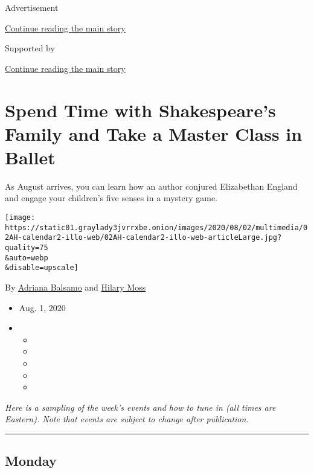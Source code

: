 Advertisement

\protect\hyperlink{after-top}{Continue reading the main story}

Supported by

\protect\hyperlink{after-sponsor}{Continue reading the main story}

\hypertarget{spend-time-with-shakespeares-family-and-take-a-master-class-in-ballet}{%
\section{Spend Time with Shakespeare's Family and Take a Master Class in
Ballet}\label{spend-time-with-shakespeares-family-and-take-a-master-class-in-ballet}}

As August arrives, you can learn how an author conjured Elizabethan
England and engage your children's five senses in a mystery game.

\texttt{[image: https://static01.graylady3jvrrxbe.onion/images/2020/08/02/multimedia/02AH-calendar2-illo-web/02AH-calendar2-illo-web-articleLarge.jpg?quality=75\\\&auto=webp\\\&disable=upscale]}

By \href{https://www.nytimes3xbfgragh.onion/by/adriana-balsamo}{Adriana
Balsamo} and
\href{https://www.nytimes3xbfgragh.onion/by/hilary-moss}{Hilary Moss}

\begin{itemize}
\item
  Aug. 1, 2020
\item
  \begin{itemize}
  \item
  \item
  \item
  \item
  \item
  \end{itemize}
\end{itemize}

\emph{Here is a sampling of the week's events and how to tune in (all
times are Eastern). Note that events are subject to change after
publication.}

\begin{center}\rule{0.5\linewidth}{\linethickness}\end{center}

\hypertarget{monday}{%
\subsection{Monday}\label{monday}}

